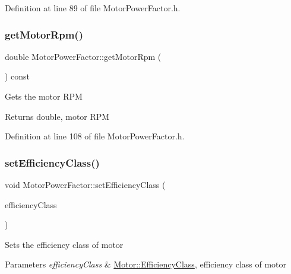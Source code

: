 Definition at line 89 of file Motor\+Power\+Factor.\+h.

\mbox{\label{class_motor_power_factor_acc7e144fc6c05446141cb0e07be03d70}} 
\subsubsection{\texorpdfstring{get\+Motor\+Rpm()}{getMotorRpm()}}
{\footnotesize\ttfamily double Motor\+Power\+Factor\+::get\+Motor\+Rpm (\begin{DoxyParamCaption}{ }\end{DoxyParamCaption}) const\hspace{0.3cm}{\ttfamily [inline]}}

Gets the motor R\+PM

\begin{DoxyReturn}{Returns}
double, motor R\+PM 
\end{DoxyReturn}


Definition at line 108 of file Motor\+Power\+Factor.\+h.

\mbox{\label{class_motor_power_factor_add3125243d7f11131abc4e1d172ffdfc}} 
\subsubsection{\texorpdfstring{set\+Efficiency\+Class()}{setEfficiencyClass()}}
{\footnotesize\ttfamily void Motor\+Power\+Factor\+::set\+Efficiency\+Class (\begin{DoxyParamCaption}\item[{\hyperlink{class_motor_afa022971ae062406a9f588c601673d4e}{Motor\+::\+Efficiency\+Class}}]{efficiency\+Class }\end{DoxyParamCaption})\hspace{0.3cm}{\ttfamily [inline]}}

Sets the efficiency class of motor


\begin{DoxyParams}{Parameters}
{\em efficiency\+Class} & \hyperlink{class_motor_afa022971ae062406a9f588c601673d4e}{Motor\+::\+Efficiency\+Class}, efficiency class of motor \\
\hline
\end{DoxyParams}


